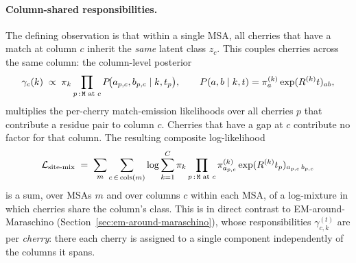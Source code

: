 \paragraph{Column-shared responsibilities.}
The defining observation is that within a single MSA, all cherries
that have a match at column $c$ inherit the \emph{same} latent class
$z_c$.  This couples cherries across the same column: the column-level
posterior
\[
\gamma_c(k)
\;\propto\;
\pi_k \prod_{p \,:\, {\tt M} \text{ at } c}
P\!\bigl(a_{p,c}, b_{p,c} \mid k, t_p\bigr),
\qquad
P(a, b \mid k, t)
= \pi^{(k)}_a \exp(R^{(k)} t)_{ab},
\]
multiplies the per-cherry match-emission likelihoods over all cherries
$p$ that contribute a residue pair to column $c$.  Cherries that have
a gap at $c$ contribute no factor for that column.  The resulting
composite log-likelihood
\begin{equation}\label{eq:em-cherryml-ll}
\mathcal{L}_{\text{site-mix}}
\;=\;
\sum_m \sum_{c \,\in\, \text{cols}(m)}
\log \sum_{k=1}^{C} \pi_k
\prod_{p \,:\, {\tt M} \text{ at } c}
\pi^{(k)}_{a_{p,c}}
\exp(R^{(k)} t_p)_{a_{p,c}\,b_{p,c}}
\end{equation}
is a sum, over MSAs $m$ and over columns $c$ within each MSA, of a
log-mixture in which cherries share the column's class.  This is in
direct contrast to EM-around-Maraschino
(Section~\ref{sec:em-around-maraschino}), whose responsibilities
$\gamma^{(t)}_{c,k}$ are per \emph{cherry}: there each cherry is
assigned to a single component independently of the columns it
spans.

